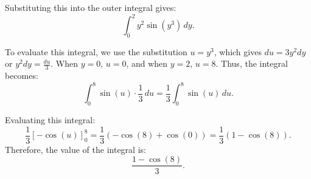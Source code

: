 \documentclass[reqno, 12pt]{amsart}
\begin{document}
\begin{itemize}
\begin{itemize}
\begin{answerbox}
          Substituting this into the outer integral gives:
          \[
            \int_0^2 y^2 \sin(y^3) \, dy.
          \]

          To evaluate this integral, we use the substitution \(u = y^3\), which gives \(du = 3y^2 dy\) or \(y^2 dy = \frac{du}{3}\). When \(y = 0\), \(u = 0\), and when \(y = 2\), \(u = 8\). Thus, the integral becomes:
          \[
            \int_0^8 \sin(u) \cdot \frac{1}{3} \, du = \frac{1}{3} \int_0^8 \sin(u) \, du.
          \]

          Evaluating this integral:
          \[
            \frac{1}{3} \left[ -\cos(u) \right]_0^8 = \frac{1}{3} \left( -\cos(8) + \cos(0) \right) = \frac{1}{3} \left(1 - \cos(8) \right).
          \]
          Therefore, the value of the integral is:
          \[
            \frac{1 - \cos(8)}{3}.
          \]
        \end{answerbox}
    \end{itemize}

\end{itemize}
\end{document}
